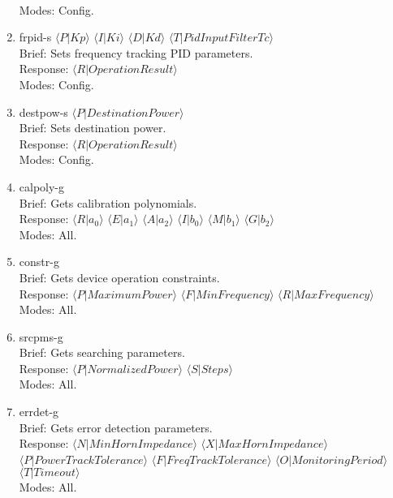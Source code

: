 \documentclass{article}
\begin{document}
\begin{enumerate}
            \\ Modes: Config.
      \item frpid-s $\langle P|Kp \rangle$ $\langle I|Ki \rangle$ $\langle D|Kd \rangle$
            $\langle T|PidInputFilterTc \rangle$
            \\ Brief: Sets frequency tracking PID parameters.
            \\ Response: $\langle R|OperationResult \rangle$
            \\ Modes: Config.
      \item destpow-s $\langle P|DestinationPower \rangle$
            \\ Brief: Sets destination power.
            \\ Response: $\langle R|OperationResult \rangle$
            \\ Modes: Config.
      \item calpoly-g
            \\ Brief: Gets calibration polynomials.
            \\ Response: $\langle R|a_0 \rangle$ $\langle E|a_1 \rangle$ $\langle A|a_2 \rangle$
            $\langle I|b_0 \rangle$ $\langle M|b_1 \rangle$ $\langle G|b_2 \rangle$
            \\ Modes: All.
      \item constr-g
            \\ Brief: Gets device operation constraints. 
            \\ Response: $\langle P|MaximumPower \rangle$ $\langle F|MinFrequency \rangle$ $\langle R|MaxFrequency \rangle$
            \\ Modes: All.
      \item srcpms-g
            \\ Brief: Gets searching parameters.
            \\ Response: $\langle P|NormalizedPower \rangle$  $\langle S|Steps \rangle$
            \\ Modes: All.
      \item errdet-g
            \\ Brief: Gets error detection parameters.        
            \\ Response: $\langle N|MinHornImpedance \rangle$ $\langle X|MaxHornImpedance \rangle$ \\
            $\langle P|PowerTrackTolerance \rangle$ $\langle F|FreqTrackTolerance \rangle$
            $\langle O|MonitoringPeriod \rangle$ $\langle T|Timeout \rangle$
            \\ Modes: All.

\end{enumerate}
\end{document}
